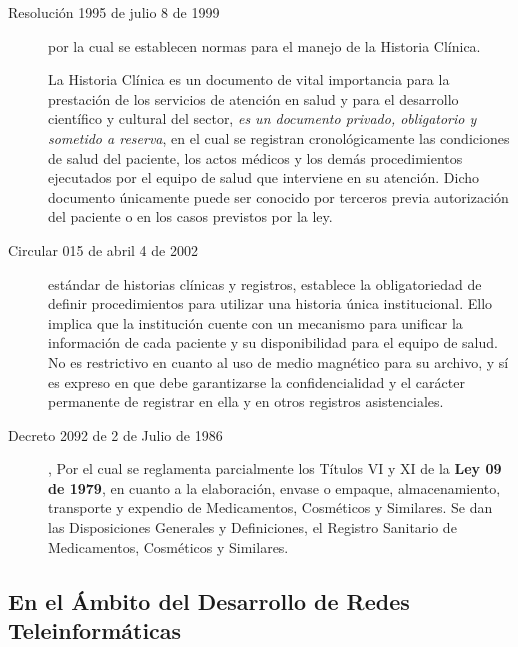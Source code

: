\begin{description}
\item[Resolución 1995 de julio 8 de 1999] por la cual se establecen normas para el manejo de la Historia Clínica.

La Historia Clínica es un documento de vital importancia para la prestación de los servicios de atención en salud y para el desarrollo científico y cultural del sector, \textit{es un documento privado, obligatorio y sometido a reserva}, en el cual se registran cronológicamente las condiciones de salud del paciente, los actos médicos y los demás procedimientos ejecutados por el equipo de salud que interviene en su atención. Dicho documento únicamente puede ser conocido por terceros previa autorización del paciente o en los casos previstos por la ley. 


\item[Circular 015 de abril 4 de 2002] estándar de historias clínicas y registros, establece la obligatoriedad de definir procedimientos para utilizar una historia única institucional. Ello implica que la institución cuente con un mecanismo para unificar la información de cada paciente y su disponibilidad para el equipo de salud. No es restrictivo en cuanto al uso de medio magnético para su archivo, y sí es expreso en que debe garantizarse la confidencialidad y el carácter permanente de registrar en ella y en otros registros asistenciales.


\item [Decreto 2092 de 2 de Julio de 1986], Por el cual se reglamenta parcialmente los Títulos VI y XI de la \textbf{Ley 09 de 1979}, en cuanto a la elaboración, envase o empaque, almacenamiento, transporte y expendio de Medicamentos, Cosméticos y Similares. Se dan las Disposiciones Generales y Definiciones, el Registro Sanitario de Medicamentos, Cosméticos y Similares.
\end{description}

\subsection{En el Ámbito del Desarrollo de Redes Teleinformáticas}

